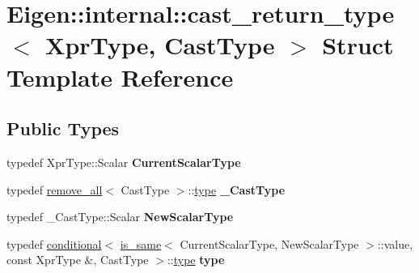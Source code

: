 \hypertarget{struct_eigen_1_1internal_1_1cast__return__type}{}\section{Eigen\+:\+:internal\+:\+:cast\+\_\+return\+\_\+type$<$ Xpr\+Type, Cast\+Type $>$ Struct Template Reference}
\label{struct_eigen_1_1internal_1_1cast__return__type}
\subsection*{Public Types}
\begin{DoxyCompactItemize}
\item 
\mbox{\label{struct_eigen_1_1internal_1_1cast__return__type_a596724bf517968c8384b050916a1a076}} 
typedef Xpr\+Type\+::\+Scalar {\bfseries Current\+Scalar\+Type}
\item 
\mbox{\label{struct_eigen_1_1internal_1_1cast__return__type_a1c9077977303cecc13d0069f58624662}} 
typedef \hyperlink{struct_eigen_1_1internal_1_1remove__all}{remove\+\_\+all}$<$ Cast\+Type $>$\+::\hyperlink{class_eigen_1_1internal_1_1_tensor_lazy_evaluator_writable}{type} {\bfseries \+\_\+\+Cast\+Type}
\item 
\mbox{\label{struct_eigen_1_1internal_1_1cast__return__type_aa13fd8b2e8fe3a4cdfc25b4f0961cbec}} 
typedef \+\_\+\+Cast\+Type\+::\+Scalar {\bfseries New\+Scalar\+Type}
\item 
\mbox{\label{struct_eigen_1_1internal_1_1cast__return__type_a317bf470ba15bfe4cdfc28991ef8302c}} 
typedef \hyperlink{struct_eigen_1_1internal_1_1conditional}{conditional}$<$ \hyperlink{struct_eigen_1_1internal_1_1is__same}{is\+\_\+same}$<$ Current\+Scalar\+Type, New\+Scalar\+Type $>$\+::value, const Xpr\+Type \&, Cast\+Type $>$\+::\hyperlink{class_eigen_1_1internal_1_1_tensor_lazy_evaluator_writable}{type} {\bfseries type}
\item 
\mbox{\label{struct_eigen_1_1internal_1_1cast__return__type_a596724bf517968c8384b050916a1a076}} 

\end{DoxyCompactItemize}
